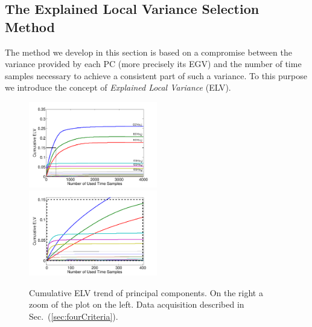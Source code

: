 \subsection{The Explained Local Variance Selection Method} 
The method we develop in this section is based on a compromise between the variance provided by each PC (more precisely its EGV) and the number of time samples necessary to achieve a consistent part of such a variance. To this purpose we  introduce the concept of {\em Explained Local Variance} (ELV).
\begin{figure}
\includegraphics[width=0.5\textwidth]{figures/cumulativeELVallRectangle.pdf} 
\includegraphics[width=0.5\textwidth]{figures/cumulativeELVzoomedRectangle.pdf} 
\caption{Cumulative ELV trend of principal components. On the right a zoom of the plot on the left. Data acquisition described in Sec.~(\ref{sec:fourCriteria}).}\label{fig:ELVcumulative}
\end{figure}


